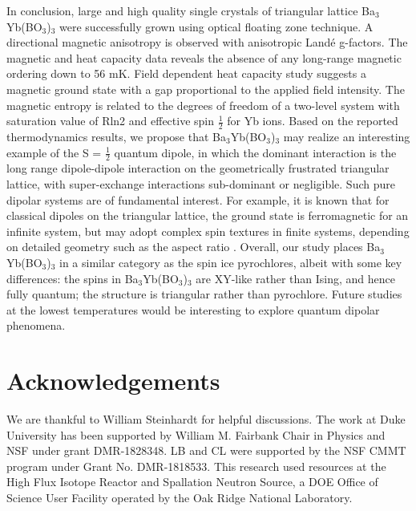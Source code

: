 \documentclass[aps,prl,reprint,showpacs,showkeys,superscriptaddress,floatfix,twocolumn]{revtex4-2}
\newcommand{\bybo}{Ba$_3$Yb(BO$_3$)$_3$}
\begin{document}
In conclusion, large and high quality single crystals of triangular lattice \bybo{} were successfully grown using optical floating zone technique. A directional magnetic anisotropy is observed with anisotropic Land\'e g-factors. The magnetic and heat capacity data reveals the absence of any long-range magnetic ordering down to 56 mK. Field dependent heat capacity study suggests a magnetic ground state with a gap proportional to the applied field intensity. The magnetic entropy is related to the degrees of freedom of a two-level system with saturation value of Rln2 and effective spin $\frac{1}{2}$ for Yb ions. Based on the reported thermodynamics results, we propose that \bybo{} may realize an interesting example of the S = $\frac{1}{2}$ quantum dipole, in which the dominant interaction is the long range dipole-dipole interaction on the geometrically frustrated triangular lattice, with super-exchange interactions sub-dominant or negligible. Such pure dipolar systems are of fundamental interest. For example, it is known that for classical dipoles on the triangular lattice, the ground state is ferromagnetic for an infinite system, but may adopt complex spin textures in finite systems, depending on detailed geometry such as the aspect ratio \cite{PolitiPRB2006}. Overall, our study places \bybo{} in a similar category as the spin ice pyrochlores, albeit with some key differences: the spins in \bybo{} are XY-like rather than Ising, and hence fully quantum; the structure is triangular rather than pyrochlore. Future studies at the lowest temperatures would be interesting to explore quantum dipolar phenomena.

\section{Acknowledgements}
We are thankful to William Steinhardt for helpful discussions. The work at Duke University has been supported by William M. Fairbank Chair in Physics and NSF under grant DMR-1828348.  LB and CL were supported by the NSF CMMT program under Grant No. DMR-1818533. This research used resources at the High Flux Isotope Reactor and Spallation Neutron Source, a DOE Office of Science User Facility operated by the Oak Ridge National Laboratory.



\end{document}
